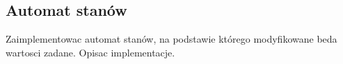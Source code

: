 \subsection{Automat stanów}
\label{lab:zad6}



\ifdefined\CompileFigures
%    
\fi

Zaimplementowac automat stanów, na podstawie którego modyfikowane beda wartosci
zadane. Opisac implementacje.

\newpage
